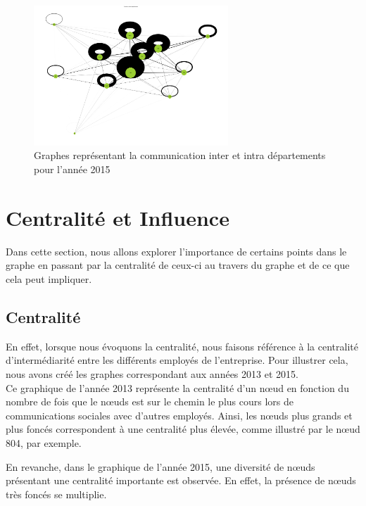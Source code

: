 \documentclass{article}
\begin{document}
\begin{figure}[!h]
    \centering
    \includegraphics[width=0.65\textwidth]{assets/communaute/communaute_communication_2015.png}
    \caption{Graphes représentant la communication inter et intra départements pour l'année 2015}
    \label{fig:communaute_communication_2015}
\end{figure}

\section{Centralité et Influence}

Dans cette section, nous allons explorer l’importance de certains points dans le graphe en passant par la centralité de ceux-ci au travers du graphe et de ce que cela peut impliquer.

\subsection{Centralité}

En effet, lorsque nous évoquons la centralité, nous faisons référence à la centralité d'intermédiarité entre les différents employés de l'entreprise. Pour illustrer cela, nous avons créé les graphes correspondant aux années 2013 et 2015. \\

Ce graphique de l'année 2013 représente la centralité d'un nœud en fonction du nombre de fois que le nœuds est sur le chemin le plus cours lors de communications sociales avec d'autres employés. Ainsi, les nœuds plus grands et plus foncés correspondent à une centralité plus élevée, comme illustré par le nœud 804, par exemple.

En revanche, dans le graphique de l'année 2015, une diversité de nœuds présentant une centralité importante est observée. En effet, la présence de nœuds très foncés se multiplie.
\end{document}
